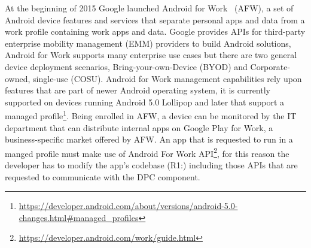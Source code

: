 At the beginning of 2015 Google launched Android for Work~\cite{AFW} (AFW), a set of Android device features and services that separate personal apps and data from a work profile containing work apps and data. Google provides APIs for third-party enterprise mobility management (EMM) providers to build Android solutions, Android for Work supports many enterprise use cases but there are two general device deployment scenarios, Bring-your-own-Device (BYOD) and Corporate-owned, single-use (COSU). Android for Work management capabilities rely upon features that are part of newer Android operating system, it is currently supported on devices running Android 5.0 Lollipop and later that support a managed profile\footnote{\url{https://developer.android.com/about/versions/android-5.0-changes.html\#managed_profiles}}. Being enrolled in AFW, a device can be monitored by the IT department that can distribute internal apps on Google Play for Work, a business-specific market offered by AFW. An app that is requested to run in a manged profile must make use of  Android For Work API\footnote{\url{https://developer.android.com/work/guide.html}}, for this reason the developer has to modify the app's codebase (R1:) including those APIs that are requested to communicate with the DPC component. 